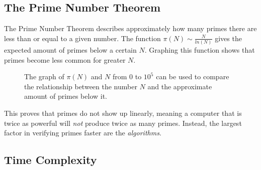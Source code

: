 \documentclass[main.tex]{subfiles}
\begin{document}
\subsection{The Prime Number Theorem}
The Prime Number Theorem \cite{theorem:prime_num} describes approximately how
many primes there are less than or equal to a given number. The function $\pi(N)
\sim \frac{N}{ln(N)}$ gives the expected amount of primes below a certain $N$.
Graphing this function shows that primes become less common for greater $N$.

\begin{figure}[ht]
  \begin{center}
  \end{center}
  \caption{The graph of $\pi(N)$ and $N$ from $0$ to $10^{5}$ can be used to
    compare the relationship between the number $N$ and the approximate amount
    of primes below it.}
\end{figure}

This proves that primes do not show up linearly, meaning a computer that is
twice as powerful will \textit{not} produce twice as many primes. Instead, the
largest factor in verifying primes faster are the \textit{algorithms}.

\subsection{Time Complexity}
\end{document}
